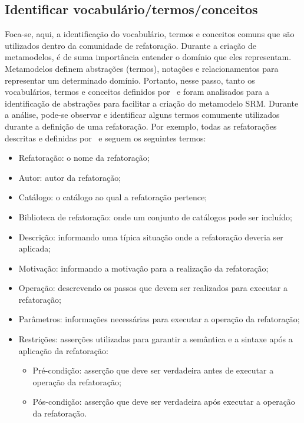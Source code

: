 \subsection{Identificar vocabulário/termos/conceitos}

Foca-se, aqui, a identificação do vocabulário, termos e conceitos comuns que são utilizados dentro da comunidade de refatoração. Durante a criação de metamodelos, é de suma importância entender o domínio que eles representam. Metamodelos definem abstrações (termos), notações e relacionamentos para representar um determinado domínio. Portanto, nesse passo, tanto os vocabulários, termos e conceitos definidos por~ e  foram analisados para a identificação de abstrações para facilitar a criação do metamodelo SRM. Durante a análise, pode-se observar e identificar alguns termos comumente utilizados durante a definição de uma refatoração. Por exemplo, todas as refatorações descritas e definidas por~ e  seguem os seguintes termos: 

\begin{itemize}
\item Refatoração: o nome da refatoração;
\item Autor: autor da refatoração;
\item Catálogo: o catálogo ao qual a refatoração pertence;
\item Biblioteca de refatoração: onde um conjunto de catálogos pode ser incluído;
\item Descrição: informando uma típica situação onde a refatoração deveria ser aplicada;
\item Motivação: informando a motivação para a realização da refatoração;
\item Operação: descrevendo os passos que devem ser realizados para executar a refatoração;
\item Parâmetros: informações necessárias para executar a operação da refatoração;
\item Restrições: asserções utilizadas para garantir a semântica e a sintaxe após a aplicação da refatoração:
\begin{itemize}
\item Pré-condição: asserção que deve ser verdadeira antes de executar a operação da refatoração;
\item Pós-condição: asserção que deve ser verdadeira após executar a operação da refatoração.
\end{itemize}
\end{itemize}

